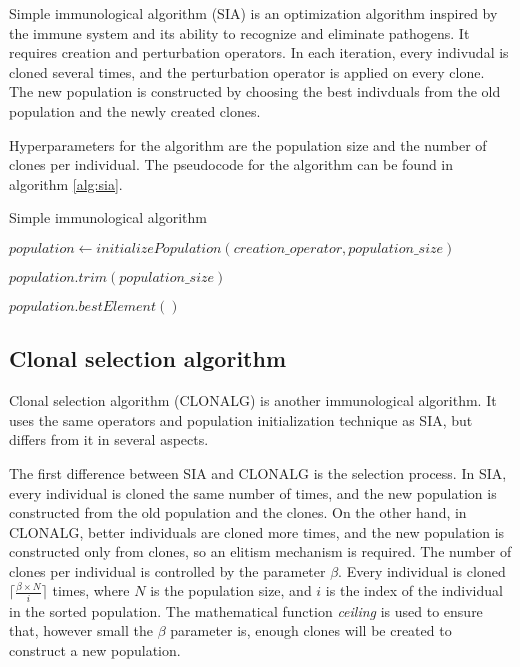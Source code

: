 Simple immunological algorithm (SIA) \citep{sia} is an optimization algorithm inspired by the immune system and its ability to recognize and eliminate pathogens. It requires creation and perturbation operators. In each iteration, every indivudal is cloned several times, and the perturbation operator is applied on every clone. The new population is constructed by choosing the best indivduals from the old population and the newly created clones.

Hyperparameters for the algorithm are the population size and the number of clones per individual. The pseudocode for the algorithm can be found in algorithm \ref{alg:sia}.

\begin{algorithm}[!htbp]
    \caption{Simple immunological algorithm}
    \label{alg:sia}

    $population \gets initializePopulation(creation\_operator, population\_size)$\;

     {
        $population.trim(population\_size)$\;
    }

    \Return $population.bestElement()$\;
    \end{algorithm}

\subsection{Clonal selection algorithm}
\label{sec:clonalg}

Clonal selection algorithm (CLONALG) \citep{clonalg} is another immunological algorithm. It uses the same operators and population initialization technique as SIA, but differs from it in several aspects. 

The first difference between SIA and CLONALG is the selection process. In SIA, every individual is cloned the same number of times, and the new population is constructed from the old population and the clones. On the other hand, in CLONALG, better individuals are cloned more times, and the new population is constructed only from clones, so an elitism mechanism is required. The number of clones per individual is controlled by the parameter $\beta$. Every individual is cloned $\lceil \frac{\beta \times N}{i} \rceil$ times, where $N$ is the population size, and $i$ is the index of the individual in the sorted population. The mathematical function \textit{ceiling} is used to ensure that, however small the $\beta$ parameter is, enough clones will be created to construct a new population.

